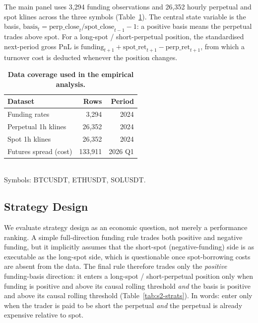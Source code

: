 \documentclass[10pt,twocolumn,a4paper]{article}
\begin{document}
The main panel uses 3{,}294 funding observations and 26{,}352 hourly
perpetual and spot klines across the three symbols
(Table~\ref{tab:s2-data}).  The central state variable is the basis,
$\text{basis}_t = \text{perp\_close}_t / \text{spot\_close}_{t-1} - 1$: a
positive basis means the perpetual trades above spot.  For a long-spot /
short-perpetual position, the standardised next-period gross PnL is
$\text{funding}_{t+1} + \text{spot\_ret}_{t+1} - \text{perp\_ret}_{t+1}$,
from which a turnover cost is deducted whenever the position changes.

\begin{table}[H]
  \centering
  \caption{\textbf{Data coverage used in the empirical analysis.}}
  \label{tab:s2-data}
  \begin{tabular}{lrr}
    \toprule
    \textbf{Dataset} & \textbf{Rows} & \textbf{Period} \\
    \midrule
    Funding rates        & 3{,}294   & 2024 \\
    Perpetual 1h klines  & 26{,}352  & 2024 \\
    Spot 1h klines       & 26{,}352  & 2024 \\
    Futures spread (cost)& 133{,}911 & 2026 Q1 \\
    \bottomrule
  \end{tabular}\\[2pt]
  {\footnotesize Symbols: BTCUSDT, ETHUSDT, SOLUSDT.}
\end{table}

\subsection{Strategy Design}

We evaluate strategy design as an economic question, not merely a
performance ranking.  A simple full-direction funding rule trades both
positive and negative funding, but it implicitly assumes that the
short-spot (negative-funding) side is as executable as the long-spot side,
which is questionable once spot-borrowing costs are absent from the data.
The final rule therefore trades only the \emph{positive} funding-basis
direction: it enters a long-spot / short-perpetual position only when
funding is positive and above its causal rolling threshold \emph{and} the
basis is positive and above its causal rolling threshold
(Table~\ref{tab:s2-strats}).  In words: enter only when the trader is paid
to be short the perpetual \emph{and} the perpetual is already expensive
relative to spot.
\end{document}
